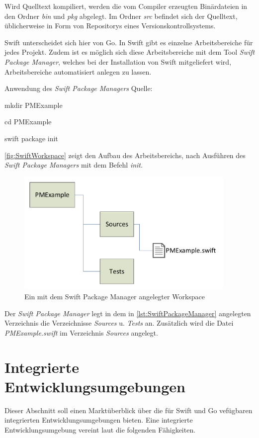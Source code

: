 Wird Quelltext kompiliert, werden die vom Compiler erzeugten Binärdateien in den Ordner \textit{bin} und \textit{pkg} abgelegt.
Im Ordner \textit{src} befindet sich der Quelltext, üblicherweise in Form von Repositorys eines Versionskontrollsystems.

Swift unterscheidet sich hier von Go. 
In Swift gibt es einzelne Arbeitsbereiche für jedes Projekt. 
Zudem ist es möglich sich diese Arbeitsbereiche mit dem Tool \textit{Swift Package Manager}, welches bei der Installation von Swift mitgeliefert wird, Arbeitsbereiche automatisiert anlegen zu lassen.

\begin{listing}[H]
\caption{Anwendung des \textit{Swift Package Managers} Quelle: \cite[S.22]{Hoffman.2017}}
\label{lst:SwiftPackageManager}
\begin{Commandline}
mkdir PMExample

cd PMExample

swift package init
\end{Commandline}
\end{listing}

\autoref{fig:SwiftWorkspace} zeigt den Aufbau des Arbeitsbereichs, nach Ausführen des \textit{Swift Package Managers} mit dem Befehl \textit{init}. 

\begin{figure}[H]
    \centering
    \includegraphics[height=6cm]{Images/SwiftWorkspace}
    \caption{Ein mit dem Swift Package Manager angelegter Workspace}
    \label{fig:SwiftWorkspace}
\end{figure}

Der \textit{Swift Package Manager} legt in dem in \autoref{lst:SwiftPackageManager} angelegten Verzeichnis die Verzeichnisse \textit{Sources} u. \textit{Tests} an.
Zusätzlich wird die Datei \textit{PMExample.swift} im Verzeichnis \textit{Sources} angelegt.

\section{Integrierte Entwicklungsumgebungen}
\label{sec:IDE}
Dieser Abschnitt soll einen Marktüberblick über die für Swift und Go vefügbaren integrierten Entwicklungsumgebungen bieten.
Eine integrierte Entwicklungsumgebung vereint laut \cite[]{TechnoPedia} die folgenden Fähigkeiten.

